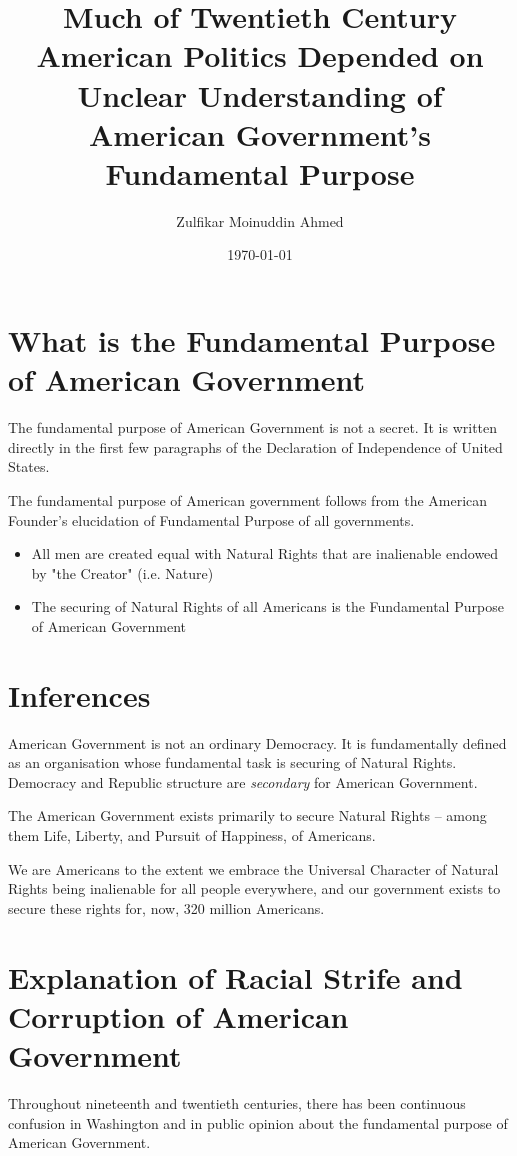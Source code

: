 \documentclass{amsart}
\title{Much of Twentieth Century American Politics Depended on Unclear Understanding of American Government's Fundamental Purpose}
\author{Zulfikar Moinuddin Ahmed}
\date{\today}
\begin{document}
\maketitle

\section{What is the Fundamental Purpose of American Government}

The fundamental purpose of American Government is not a secret.  It is written directly in the first few paragraphs of the Declaration of Independence of United States.

The fundamental purpose of American government follows from the American Founder's elucidation of Fundamental Purpose of all governments.  

\begin{itemize}
\item All men are created equal with Natural Rights that are inalienable endowed by "the Creator" (i.e. Nature)
\item The securing of Natural Rights of all Americans is the Fundamental Purpose of American Government
\end{itemize}

\section{Inferences}

American Government is not an ordinary Democracy.  It is fundamentally defined as an organisation whose fundamental task is securing of Natural Rights.  Democracy and Republic structure are {\em secondary} for American Government.

The American Government exists primarily to secure Natural Rights -- among them Life, Liberty, and Pursuit of Happiness, of Americans.  

We are Americans to the extent we embrace the Universal Character of Natural Rights being inalienable for all people everywhere, and our government exists to secure these rights for, now, 320 million Americans.

\section{Explanation of Racial Strife and Corruption of American Government}

Throughout nineteenth and twentieth centuries, there has been continuous confusion in Washington and in public opinion about the fundamental purpose of American Government. 
\end{document}
